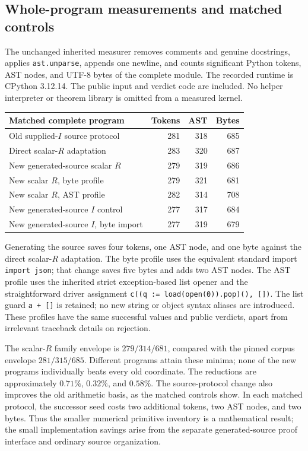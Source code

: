 \subsection{Whole-program measurements and matched controls}

The unchanged inherited measurer removes comments and genuine
docstrings, applies \texttt{ast.unparse}, appends one newline, and counts
significant Python tokens, AST nodes, and UTF-8 bytes of the complete
module. The recorded runtime is CPython 3.12.14. The public input and
verdict code are included. No helper interpreter or theorem library is
omitted from a measured kernel.

\begin{center}\small
\begin{tabular}{lrrr}
\toprule
Matched complete program & Tokens & AST & Bytes\\
\midrule
Old supplied-$I$ source protocol &281&318&685\\
Direct scalar-$R$ adaptation &283&320&687\\
New generated-source scalar $R$ &279&319&686\\
New scalar $R$, byte profile &279&321&681\\
New scalar $R$, AST profile &282&314&708\\
\midrule
New generated-source $I$ control &277&317&684\\
New generated-source $I$, byte import &277&319&679\\
\bottomrule
\end{tabular}
\end{center}

Generating the source saves four tokens, one AST node, and one byte
against the direct scalar-$R$ adaptation. The byte profile uses the
equivalent standard import \texttt{import json}; that change saves five
bytes and adds two AST nodes. The AST profile uses the inherited strict
exception-based list opener and the straightforward driver assignment
\texttt{c((q := load(open(0)).pop)(), [])}. The list guard
\texttt{a + []} is retained; no new string or object syntax aliases are
introduced. These profiles have the same successful values and public
verdicts, apart from irrelevant traceback details on rejection.

The scalar-$R$ family envelope is $279/314/681$, compared with the pinned
corpus envelope $281/315/685$. Different programs attain these minima;
none of the new programs individually beats every old coordinate.
The reductions are approximately $0.71\%$, $0.32\%$, and $0.58\%$.
The source-protocol change also improves the old arithmetic basis, as
the matched controls show. In each matched protocol, the successor
seed costs two additional tokens, two AST nodes, and two bytes. Thus
the smaller numerical primitive inventory is a mathematical result;
the small implementation savings arise from the separate generated-source
proof interface and ordinary source organization.


